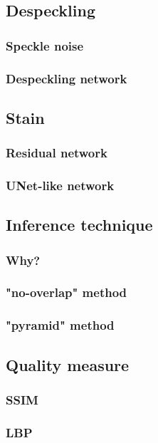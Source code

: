 \documentclass{beamer}
\begin{document}
\subsection{Despeckling}

\begin{frame}
\frametitle{Speckle noise}
\end{frame}

\begin{frame}
\frametitle{Despeckling network}
\end{frame}

\subsection{Stain}

\begin{frame}
\frametitle{Residual network}
\end{frame}

\begin{frame}
\frametitle{UNet-like network}
\end{frame}

\subsection{Inference technique}

\begin{frame}
\frametitle{Why?}
\end{frame}

\begin{frame}
\frametitle{"no-overlap" method}
\end{frame}

\begin{frame}
\frametitle{"pyramid" method}
\end{frame}

\subsection{Quality measure}

\begin{frame}
\frametitle{SSIM}
\end{frame}


\begin{frame}
\frametitle{LBP}
\end{frame}
\end{document}
